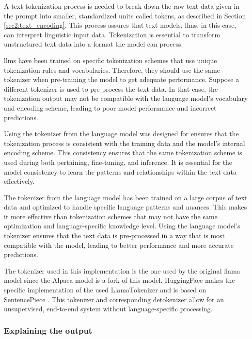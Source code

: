         A text tokenization process is needed to break down the raw text data given in the prompt into smaller, standardized units called tokens, as described in Section \ref{sec2:text_encoding}. 
        This process assures that text models, \glspl{llm}, in this case, can interpret linguistic input data. Tokenization is essential to transform unstructured text data into a format the model can process.
        
        \glspl{llm} have been trained on specific tokenization schemes that use unique tokenization rules and vocabularies. Therefore, they should use the same tokenizer when pre-training the model to get adequate performance. Suppose a different tokenizer is used to pre-process the text data. In that case, the tokenization output may not be compatible with the language model's vocabulary and encoding scheme, leading to poor model performance and incorrect predictions.
        
        Using the tokenizer from the language model was designed for ensures that the tokenization process is consistent with the training data and the model's internal encoding scheme. 
        This consistency ensures that the same tokenization scheme is used during both pertaining, fine-tuning, and inference. It is essential for the model consistency to learn the patterns and relationships within the text data effectively. 
    
        The tokenizer from the language model has been trained on a large corpus of text data and optimized to handle specific language patterns and nuances. This makes it more effective than tokenization schemes that may not have the same optimization and language-specific knowledge level. 
        Using the language model's tokenizer ensures that the text data is pre-processed in a way that is most compatible with the model, leading to better performance and more accurate predictions.

        The tokenizer used in this implementation is the one used by the original \gls{llama} model \cite{touvronLLaMAOpenEfficient2023} since the Alpaca model is a fork of this model. HuggingFace \cite{HuggingFaceAI} makes the specific implementation of the used LlamaTokenizer  and is based on SentencePiece \cite{LLaMATokenizer, Sentencepiece}. 
        This tokenizer and corresponding detokenizer allow for an unsupervised, end-to-end system without language-specific processing. 



        \subsubsection{Explaining the output}

